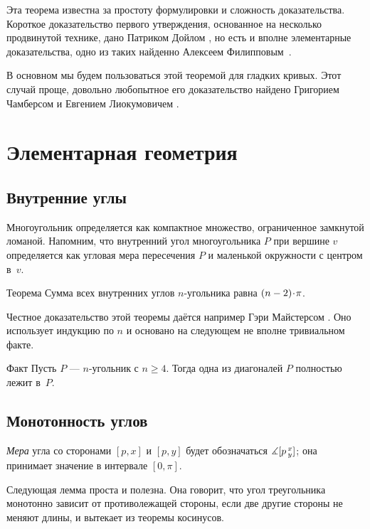 \begin{multicols}{2}
{Эта теорема известна за простоту формулировки и сложность доказательства.
Короткое доказательство первого утверждения, основанное на несколько продвинутой технике, дано Патриком Дойлом \cite{doyle}, но есть и вполне элементарные доказательства, одно из таких найденно Алексеем Филипповым~\cite{filippov}.

В основном мы будем пользоваться этой теоремой для гладких кривых.
Этот случай проще, довольно любопытное его доказательство найдено Григорием Чамберсом и Евгением Лиокумовичем \cite{chambers-liokumovich}.

\section{Элементарная геометрия}

\subsection*{Внутренние углы}

Многоугольник определяется как компактное множество, ограниченное замкнутой ломаной. 
Напомним, что внутренний угол многоугольника $P$ при вершине $v$
определяется как угловая мера пересечения $P$ и маленькой окружности с центром в~$v$.

\begin{thm}{Теорема}\label{thm:sum=(n-2)pi}
Сумма всех внутренних углов $n$-угольника равна $(n\z-2)\cdot\pi$.
\end{thm}

Честное доказательство этой теоремы даётся например Гэри Майстерсом \cite{meisters}.
Оно использует индукцию по $n$ и основано на следующем не вполне тривиальном факте.

\begin{thm}{Факт}
Пусть $P$ --- $n$-угольник с $n\ge 4$.
Тогда одна из диагоналей $P$ полностью лежит в~$P$.
\end{thm}

\subsection*{Монотонность углов}

{}\emph{Мера} угла со сторонами $[p,x]$ и $[p,y]$ будет обозначаться $\measuredangle[p\,{}^{x}_{y}]$;
она принимает значение в интервале $[0,\pi]$.

Следующая лемма проста и полезна.
Она говорит, что угол треугольника монотонно зависит от противолежащей стороны, если две другие стороны не меняют длины, и вытекает из теоремы косинусов.

}
\end{multicols}

